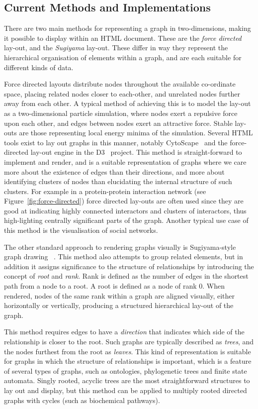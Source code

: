 \documentclass[10pt,a4paper,twocolumn]{article}
\begin{document}
\subsection*{Current Methods and Implementations}

There are two main methods for representing a graph in two-dimensions, making
it possible to display within an HTML document. These are the \emph{force 
directed} lay-out, and the \emph{Sugiyama} lay-out. These differ in way they
represent the hierarchical organisation of elements within a graph, and are
each suitable for different kinds of data.

Force directed layouts distribute nodes throughout the available co-ordinate
space, placing related nodes closer to each-other, and unrelated nodes further
away from each other. A typical method of achieving this is to model the lay-out
as a two-dimensional particle simulation, where nodes exert a repulsive force
upon each other, and edges between nodes exert an attractive force. Stable lay-outs
are those representing local energy minima of the simulation. Several HTML
tools exist to lay out graphs in this manner, notably CytoScape~\cite{cytoscape}
and the force-directed lay-out engine in the D3~\cite{d3} project. This method
is straight-forward to implement and render, and is a suitable representation of
graphs where we care more about the existence of edges than their directions, and
more about identifying clusters of nodes than elucidating the internal structure
of such clusters. For example in a protein-protein interaction
network (see Figure~\ref{fig:force-directed}) force directed lay-outs are often used
since they are good at indicating highly connected interactors and clusters of
interactors, thus high-lighting centrally significant parts of the graph. Another typical
use case of this method is the visualisation of social networks.

The other standard approach to rendering graphs visually is Sugiyama-style 
graph drawing ~\cite{sugiyama}. This method also attempts to group related
elements, but in addition it assigns significance to the structure of relationships by
introducing the concept of \emph{root} and \emph{rank}. Rank is
defined as the number of edges in the shortest path from a node to a root. A root
is defined as a node of rank 0. When rendered, nodes of the same rank within a graph
are aligned visually, either horizontally or vertically, producing a structured
hierarchical lay-out of the graph.

This method requires edges to have a \emph{direction} that indicates which
side of the relationship is closer to the root. Such graphs are typically described
as \emph{trees}, and the nodes furthest from the root as \emph{leaves}.
This kind of representation is suitable
for graphs in which the structure of relationships is important, which is a feature
of several types of graphs, such as ontologies, phylogenetic trees and finite state
automata. Singly rooted, acyclic trees are the most straightforward structures
to lay out and display, but this method can be applied to multiply rooted directed
graphs with cycles (such as biochemical pathways). 
\end{document}
